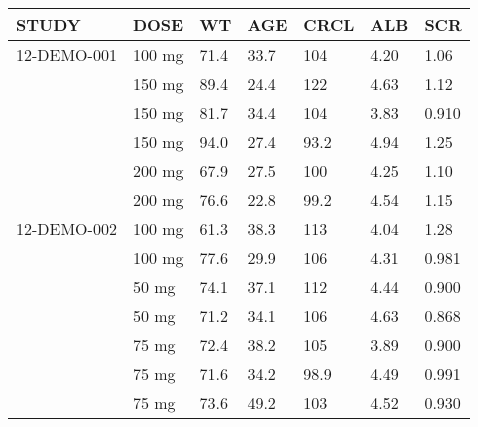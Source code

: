 {\def\arraystretch{1.4}\tabcolsep=5pt
\begin{threeparttable}
\begin{tabular}[h]{lllllll}
\hline
STUDY & DOSE & WT & AGE & CRCL & ALB & SCR \\
\hline
12-DEMO-001 & 100 mg & 71.4 & 33.7 & 104 & 4.20 & 1.06 \\
 & 150 mg & 89.4 & 24.4 & 122 & 4.63 & 1.12 \\
 & 150 mg & 81.7 & 34.4 & 104 & 3.83 & 0.910 \\
 & 150 mg & 94.0 & 27.4 & 93.2 & 4.94 & 1.25 \\
 & 200 mg & 67.9 & 27.5 & 100 & 4.25 & 1.10 \\
 & 200 mg & 76.6 & 22.8 & 99.2 & 4.54 & 1.15 \\
12-DEMO-002 & 100 mg & 61.3 & 38.3 & 113 & 4.04 & 1.28 \\
 & 100 mg & 77.6 & 29.9 & 106 & 4.31 & 0.981 \\
 & 50 mg & 74.1 & 37.1 & 112 & 4.44 & 0.900 \\
 & 50 mg & 71.2 & 34.1 & 106 & 4.63 & 0.868 \\
 & 75 mg & 72.4 & 38.2 & 105 & 3.89 & 0.900 \\
 & 75 mg & 71.6 & 34.2 & 98.9 & 4.49 & 0.991 \\
 & 75 mg & 73.6 & 49.2 & 103 & 4.52 & 0.930 \\
\hline
\end{tabular}
\end{threeparttable}
}
